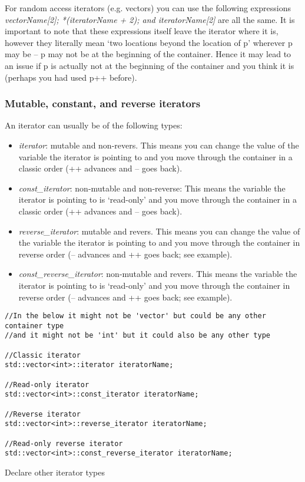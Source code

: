 For random access iterators (e.g. vectors) you can use the following expressions
\emph{vectorName[2]; *(iteratorName + 2); and iteratorName[2]} are all the same. It is important
to note that these expressions itself leave the iterator where it is, however they literally mean
`two locations beyond the location of p' wherever p may be -- p may not be at the beginning of
the container. Hence it may lead to an issue if p is actually not at the beginning of the container
and you think it is (perhaps you had used p++ before).


\subsubsection{Mutable, constant, and reverse iterators}
An iterator can usually be of the following types:
\begin{itemize}
	\item \emph{iterator}: mutable and non-revers. This means you can change the
	value of the variable the iterator is pointing to and you move through the container
	in a classic order (++ advances and -- goes back).
	\item \emph{const\_iterator}: non-mutable and non-reverse: This means the variable
	the iterator is pointing to is `read-only' and you move through the container
	in a classic order (++ advances and -- goes back).
	\item \emph{reverse\_iterator}: mutable and revers. This means you can change the
	value of the variable the iterator is pointing to and you move through the container
	in reverse order (-- advances and ++ goes back; see example).
	\item \emph{const\_reverse\_iterator}: non-mutable and revers. This means the variable
	the iterator is pointing to is `read-only' and  you move through the container
	in reverse order (-- advances and ++ goes back; see example).
\end{itemize}

\begin{listing}[H]
\begin{verbatim}
//In the below it might not be 'vector' but could be any other container type
//and it might not be 'int' but it could also be any other type

//Classic iterator
std::vector<int>::iterator iteratorName;

//Read-only iterator
std::vector<int>::const_iterator iteratorName;

//Reverse iterator
std::vector<int>::reverse_iterator iteratorName;

//Read-only reverse iterator
std::vector<int>::const_reverse_iterator iteratorName;
\end{verbatim}
\caption{Declare other iterator types}
\label{source_code_1}
\end{listing}


